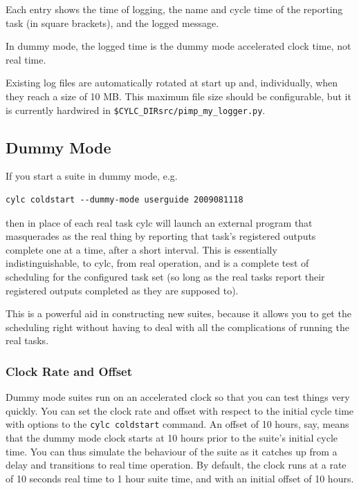 \documentclass[11pt,a4paper]{article}
\begin{document}

Each entry shows the time of logging, the name and cycle time of the
reporting task (in square brackets), and the logged message.

In dummy mode, the logged time is the dummy mode accelerated clock time, not 
real time.

Existing log files are automatically rotated at start up and,
individually, when they reach a size of 10 MB.  This maximum file 
size should be configurable, but it is currently hardwired in
\lstinline=$CYLC_DIRsrc/pimp_my_logger.py=.

\subsection{Dummy Mode} 
\label{DummyMode}

If you start a suite in dummy mode, e.g.\:

\begin{lstlisting}
cylc coldstart --dummy-mode userguide 2009081118
\end{lstlisting}

then in place of each real task cylc will launch an external program
that masquerades as the real thing by reporting that task's registered
outputs complete one at a time, after a short interval. This is
essentially indistinguishable, to cylc, from real operation, and is a
complete test of scheduling for the configured task set (so long as the
real tasks report their registered outputs completed as they are
supposed to). 

This is a powerful aid in constructing new suites, because it allows
you to get the scheduling right without having to deal with all the
complications of running the real tasks.

\subsubsection{Clock Rate and Offset}

Dummy mode suites run on an accelerated clock so that you can test
things very quickly. You can set the clock rate and offset with respect
to the initial cycle time with options to the \lstinline=cylc coldstart=
command. An offset of 10 hours, say, means that the dummy mode clock
starts at 10 hours prior to the suite's initial cycle time.  You can
thus simulate the behaviour of the suite as it catches up from a delay
and transitions to real time operation.  By default, the clock runs at a
rate of 10 seconds real time to 1 hour suite time, and with an initial
offset of 10 hours. 
\end{document}
